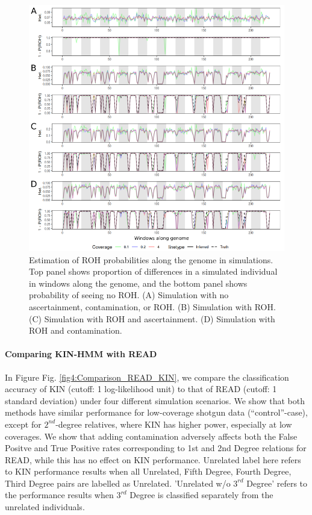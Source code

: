 \documentclass[12pt, letterpaper]{article}
\begin{document}
\begin{figure}[h!]
    \includegraphics[width=16cm]{plots/inkscape_finalImg/ROHplot_final.png}
    \centering
    \caption{Estimation of ROH probabilities along the genome in simulations. Top panel shows proportion of differences in a simulated individual in windows along the genome, and the bottom panel shows probability of seeing no ROH. (A) Simulation with no ascertainment, contamination, or ROH. (B) Simulation with ROH. (C) Simulation with ROH and ascertainment. (D) Simulation with ROH and contamination.}
    \label{fig2:ROH}
\end{figure}

\paragraph{Comparing KIN-HMM with READ}
In Figure Fig. \ref{fig4:Comparison_READ_KIN}, we compare the classification accuracy of KIN (cutoff: 1 log-likelihood unit) to that of READ (cutoff: 1 standard deviation)  under four different simulation scenarios. We show that both methods have similar performance for low-coverage shotgun data (``control''-case),  except for $2^{nd}$-degree relatives, where KIN has higher power, especially at low coverages. We show that adding contamination adversely affects both the False Positve and True Positive rates corresponding to 1st and 2nd Degree relations for READ, while this has no effect on KIN performance. Unrelated label here refers to KIN performance results when all Unrelated, Fifth Degree, Fourth Degree, Third Degree pairs are labelled as Unrelated. 'Unrelated w/o $3^{rd}$ Degree' refers to the performance results when $3^{rd}$ Degree is classified separately from the unrelated individuals.
\end{document}
